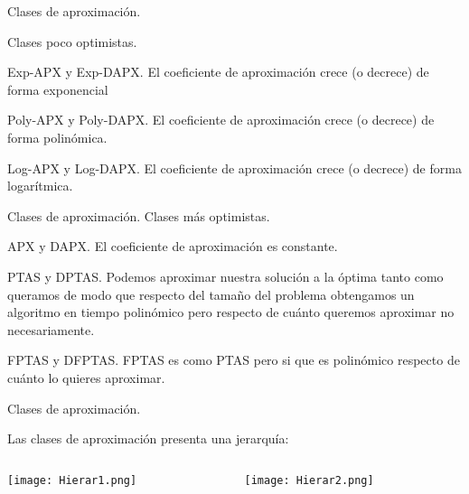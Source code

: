 \documentclass{beamer}
\begin{document}
\begin{frame}{Clases de aproximaci\'on.}

Clases poco optimistas.

\begin{block}{Exp-APX y Exp-DAPX.}
El coeficiente de aproximaci\'on crece (o decrece) de forma exponencial
\end{block}

\begin{block}{Poly-APX y Poly-DAPX.}
El coeficiente de aproximaci\'on crece (o decrece) de forma polin\'omica.
\end{block}

\begin{block}{Log-APX y Log-DAPX.}
El coeficiente de aproximaci\'on crece (o decrece) de forma logar\'itmica.
\end{block}

\end{frame}


\begin{frame}{Clases de aproximaci\'on.}
Clases m\'as optimistas.

\begin{block}{APX y DAPX.}
El coeficiente de aproximaci\'on es constante.
\end{block}

\begin{block}{PTAS y DPTAS.}
Podemos aproximar nuestra soluci\'on a la \'optima tanto como queramos de modo que respecto del tamaño del problema obtengamos un algoritmo en tiempo polin\'omico pero respecto de cu\'anto queremos aproximar no necesariamente.
\end{block}

\begin{block}{FPTAS y DFPTAS.}
FPTAS es como PTAS pero si que es polin\'omico respecto de cu\'anto lo quieres aproximar.
\end{block}

\end{frame}


\begin{frame}{Clases de aproximaci\'on.}

Las clases de aproximaci\'on presenta una jerarqu\'ia:

\begin{columns}[T]

\begin{column}{.50\textwidth}
\texttt{[image: Hierar1.png]}
\end{column}

\begin{column}{.46\textwidth}
\texttt{[image: Hierar2.png]}
\end{column}
\end{columns}
    
\end{frame}
\end{document}
